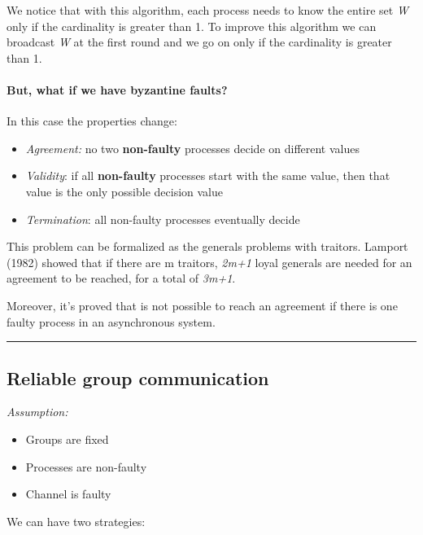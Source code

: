 We notice that with this algorithm, each process needs to know the
entire set \emph{W} only if the cardinality is greater than 1. To
improve this algorithm we can broadcast \emph{W} at the first round and
we go on only if the cardinality is greater than 1.

\paragraph{But, what if we have byzantine
faults?}\label{but-what-if-we-have-byzantine-faults}

In this case the properties change:

\begin{itemize}
\itemsep1pt\parskip0pt
\item
  \emph{Agreement:} no two \textbf{non-faulty} processes decide on
  different values
\item
  \emph{Validity}: if all \textbf{non-faulty} processes start with the
  same value, then that value is the only possible decision value
\item
  \emph{Termination}: all non-faulty processes eventually decide
\end{itemize}

This problem can be formalized as the generals problems with traitors.
Lamport (1982) showed that if there are m traitors, \emph{2m+1} loyal
generals are needed for an agreement to be reached, for a total of
\emph{3m+1}.

Moreover, it's proved that is not possible to reach an agreement if
there is one faulty process in an asynchronous system.

\begin{center}\rule{3in}{0.4pt}\end{center}

\subsection{Reliable group
communication}\label{reliable-group-communication}

\emph{Assumption:}

\begin{itemize}
\itemsep1pt\parskip0pt
\item
  Groups are fixed
\item
  Processes are non-faulty
\item
  Channel is faulty
\end{itemize}

We can have two strategies:

